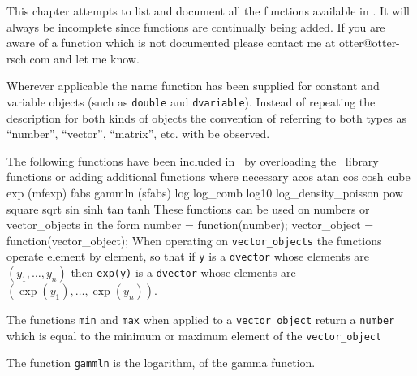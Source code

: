 %
%

\def\leftset#1{#1\hfill}
This chapter attempts to list and document all the functions
available in \ADM. It will always be incomplete since functions are
continually being added. If you are aware of a function which is
not documented please contact me at otter@otter-rsch.com and
let me know.

Wherever applicable the name function has been supplied for
constant and variable objects (such as {\tt double} and {\tt dvariable}).
Instead of repeating the description for both kinds of objects
the convention of referring to both types as ``number'', ``vector'',
``matrix'', etc. with be observed.

 The following functions have been included in \AD\ by overloading the 
\cplus\ library functions or adding additional functions where necessary
\beginexamplea
  acos atan  cos cosh cube exp (mfexp) fabs gammln (sfabs) log log_comb 
  log10 log_density_poisson pow square sqrt sin sinh tan tanh
\endexample
{}       
      
   
   
   
   
   
   
\noindent These functions can be used on numbers or vector\_objects
in the form 
\beginexample
number = function(number);
vector_object = function(vector_object);
\endexample
\noindent When operating on {\tt vector\_objects} the functions operate  
element by element, so that if {\tt y} is a {\tt dvector} whose
elements are $(y_1,\ldots,y_n)$ then {\tt exp(y)} is a 
{\tt dvector} whose elements are $(\exp(y_1),\ldots,\exp(y_n))$.

The functions {\tt min} and {\tt max} when applied to a {\tt vector\_object}
return a {\tt number} which is equal to the minimum or maximum element of the
{\tt vector\_object}

The function {\tt gammln} is the logarithm, of the gamma function.

